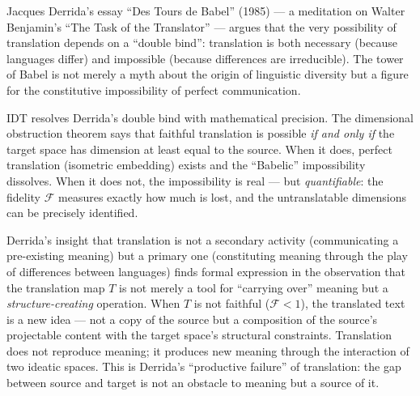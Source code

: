 \begin{interpretation}
\label{interp:ch18:derrida_babel}
Jacques Derrida's essay ``Des Tours de Babel'' (1985) --- a meditation on
Walter Benjamin's ``The Task of the Translator'' --- argues that the very
possibility of translation depends on a ``double bind'': translation is
both necessary (because languages differ) and impossible (because
differences are irreducible).  The tower of Babel is not merely a myth
about the origin of linguistic diversity but a figure for the constitutive
impossibility of perfect communication.

IDT resolves Derrida's double bind with mathematical precision.  The
dimensional obstruction theorem says that faithful translation is possible
\emph{if and only if} the target space has dimension at least equal to
the source.  When it does, perfect translation (isometric embedding) exists
and the ``Babelic'' impossibility dissolves.  When it does not, the
impossibility is real --- but \emph{quantifiable}: the fidelity
$\mathcal{F}$ measures exactly how much is lost, and the untranslatable
dimensions can be precisely identified.

Derrida's insight that translation is not a secondary activity
(communicating a pre-existing meaning) but a primary one (constituting
meaning through the play of differences between languages) finds formal
expression in the observation that the translation map $T$ is not merely
a tool for ``carrying over'' meaning but a \emph{structure-creating}
operation.  When $T$ is not faithful ($\mathcal{F} < 1$), the translated
text is a new idea --- not a copy of the source but a composition of the
source's projectable content with the target space's structural constraints.
Translation does not reproduce meaning; it produces new meaning through
the interaction of two ideatic spaces.  This is Derrida's ``productive
failure'' of translation: the gap between source and target is not an
obstacle to meaning but a source of it.
\end{interpretation}

